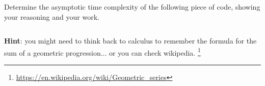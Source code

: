 \begin{prob}
    Determine the asymptotic time complexity of the following piece of code, showing your reasoning
    and your work.

    \inputminted{python}{\thisdir/include/code.py}

    \textbf{Hint}: you might need to think back to calculus to remember the formula for
    the sum of a geometric progression... or you can check wikipedia.%
    \footnote{\url{https://en.wikipedia.org/wiki/Geometric_series}}

    \begin{soln}
    
    \end{soln}

\end{prob}

